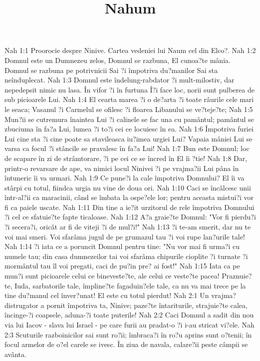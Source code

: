 

\title{Nahum}

Nah 1:1  Proorocie despre Ninive. Cartea vedeniei lui Naum cel din Elco?.
Nah 1:2  Domnul este un Dumnezeu zelos, Domnul se razbuna, El cunoa?te mânia. Domnul se razbuna pe potrivnicii Sai ?i împotriva du?manilor Sai sta neînduplecat.
Nah 1:3  Domnul este îndelung-rabdator ?i mult-milostiv, dar nepedepsit nimic nu lasa. În vifor ?i în furtuna Î?i face loc, norii sunt pulberea de sub picioarele Lui.
Nah 1:4  El cearta marea ?i o de?arta ?i toate râurile cele mari le seaca; Vasanul ?i Carmelul se ofilesc ?i floarea Libanului se ve?teje?te;
Nah 1:5  Mun?ii se cutremura înaintea Lui ?i calinele se fac una cu pamântul; pamântul se zbuciuma în fa?a Lui, lumea ?i to?i cei ce locuiesc în ea.
Nah 1:6  Împotriva furiei Lui cine sta ?i cine poate sa stavileasca iu?imea urgiei Lui? Vapaia mâniei Lui se varsa ca focul ?i stâncile se pravalesc în fa?a Lui!
Nah 1:7  Bun este Domnul; loc de scapare în zi de strâmtorare, ?i pe cei ce se încred în El îi ?tie!
Nah 1:8  Dar, printr-o revarsare de ape, va nimici locul Ninivei ?i pe vrajma?ii Lui pâna în întuneric îi va urmari.
Nah 1:9  Ce pune?i la cale împotriva Domnului? El îi va stârpi cu totul, fiindca urgia nu vine de doua ori.
Nah 1:10  Caci se încâlcesc unii într-al?ii ca maracinii, când se îmbata la ospe?ele lor; pentru aceasta mistui?i vor fi ca paiele uscate.
Nah 1:11  Din tine a ie?it urzitorul de rele împotriva Domnului ?i cel ce sfatuie?te fapte ticaloase.
Nah 1:12  A?a graie?te Domnul: "Vor fi pierdu?i ?i secera?i, oricât ar fi de viteji ?i de mul?i!"
Nah 1:13  ?i te-am smerit, dar nu te voi mai smeri. Voi sfarâma jugul de pe grumazul tau ?i voi rupe lan?urile tale!
Nah 1:14  ?i iata ce a poruncit Domnul pentru tine: "Nu vor mai fi urma?i cu numele tau; din casa dumnezeilor tai voi sfarâma chipurile cioplite ?i turnate ?i mormântul tau îl voi pregati, caci de pu?in pre? ai fost!"
Nah 1:15  Iata ca pe mun?i sunt picioarele celui ce bineveste?te, ale celui ce veste?te pacea! Praznuie?te, Iuda, sarbatorile tale, împline?te fagaduin?ele tale, ca nu va mai trece pe la tine du?manul cel înver?unat! El este cu totul pierdut!
Nah 2:1  Un vrajma? distrugator a pornit împotriva ta, Ninive; paze?te întariturile, strajuie?te calea, încinge-?i coapsele, aduna-?i toate puterile!
Nah 2:2  Caci Domnul a sadit din nou via lui Iacov - slava lui Israel - pe care furii au pradat-o ?i i-au stricat vi?ele.
Nah 2:3  Scuturile razboinicilor sai sunt ro?ii; îmbraca?i în ro?u aprins sunt o?tenii; în focul armelor de o?el carele se ivesc. În ziua de navala, calare?ii peste câmpii se avânta.
